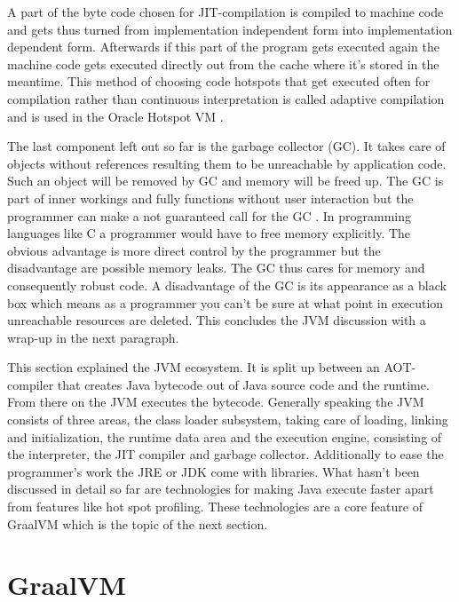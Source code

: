 A part of the byte code chosen for JIT-compilation is compiled to machine code and gets thus turned from implementation independent form into implementation dependent form. Afterwards if this part of the program gets executed again the machine code gets executed directly out from the cache where it's stored in the meantime. This method of choosing code hotspots that get executed often for compilation rather than continuous interpretation is called adaptive compilation and is used in the Oracle Hotspot VM \cite{Lindholm}.

The last component left out so far is the garbage collector (GC). It takes care of objects without references resulting them to be unreachable by application code. Such an object will be removed by GC and memory will be freed up. The GC is part of inner workings and fully functions without user interaction but the programmer can make a not guaranteed call for the GC \cite{Lindholm}. In programming languages like C a programmer would have to free memory explicitly. The obvious advantage is more direct control by the programmer but the disadvantage are possible memory leaks. The GC thus cares for memory and consequently robust code. A disadvantage of the GC is its appearance as a black box which means as a programmer you can't be sure at what point in execution unreachable resources are deleted. This concludes the JVM discussion with a wrap-up in the next paragraph.

This section explained the JVM ecosystem. It is split up between an AOT-compiler that creates Java bytecode out of Java source code and the runtime. From there on the JVM executes the bytecode. Generally speaking the JVM consists of three areas, the class loader subsystem, taking care of loading, linking and initialization, the runtime data area and the execution engine, consisting of the interpreter, the JIT compiler and garbage collector. Additionally to ease the programmer's work the JRE or JDK come with libraries. What hasn't been discussed in detail so far are technologies for making Java execute faster apart from features like hot spot profiling. These technologies are a core feature of GraalVM which is the topic of the next section.

\section{GraalVM}

